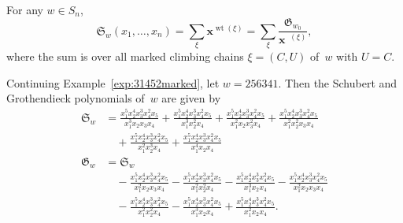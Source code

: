 \documentclass[ALCO]{cedram}
\DeclareMathOperator{\wt}{\mathrm{wt}}
\DeclareMathOperator{\dwt}{\overline{\mathrm{wt}}}
\begin{document}
\begin{corollary}
	For any $w\in S_n$,
	\[\mathfrak{S}_w(x_1,\ldots,x_n) = \sum_{\xi} \bm{x}^{\wt(\xi)} = \sum_{\xi} \frac{\mathfrak{G}_{w_0}}{\bm{x}^{\dwt(\xi)}}, \]
	where the sum is over all marked climbing chains $\xi=(C,U)$ of~$w$ with $U=C$.
\end{corollary}

\begin{example}
	\label{exp:31452polys}
	Continuing Example~\ref{exp:31452marked}, let $w=256341$. Then the Schubert and Grothendieck polynomials of~$w$ are given by
	\begin{align*}
		\mathfrak{S}_w &=\frac{x_1^5x_2^4x_3^3x_4^2x_5}{x_1^3x_2x_3x_4}+
		\frac{x_1^5x_2^4x_3^3x_4^2x_5}{x_1^3x_2^2x_4}+
		\frac{x_1^5x_2^4x_3^3x_4^2x_5}{x_1^2x_2x_3^2x_4}+
		\frac{x_1^5x_2^4x_3^3x_4^2x_5}{x_1^2x_2^2x_3x_4}\\
		&\quad+\frac{x_1^5x_2^4x_3^3x_4^2x_5}{x_1^2x_2^3x_4}+
		\frac{x_1^5x_2^4x_3^3x_4^2x_5}{x_1^4x_2x_4}\\
		\mathfrak{G}_w &= \mathfrak{S}_w\\
		&\quad-\frac{x_1^5x_2^4x_3^3x_4^2x_5}{x_1^2x_2x_3x_4}-
		\frac{x_1^5x_2^4x_3^3x_4^2x_5}{x_1^2x_2^2x_4}-
		\frac{x_1^5x_2^4x_3^3x_4^2x_5}{x_1^3x_2x_4}-
		\frac{x_1^5x_2^4x_3^3x_4^2x_5}{x_1^2x_2x_3x_4}\\
		&\quad-\frac{x_1^5x_2^4x_3^3x_4^2x_5}{x_1^2x_2^2x_4}-
		\frac{x_1^5x_2^4x_3^3x_4^2x_5}{x_1^3x_2x_4} +
		\frac{x_1^5x_2^4x_3^3x_4^2x_5}{x_1^2x_2x_4}.
	\end{align*}
\end{example}
\end{document}
